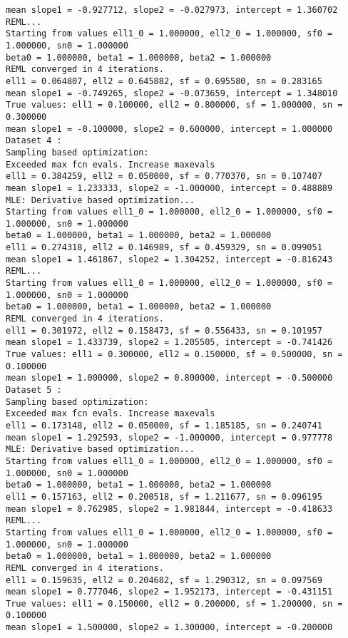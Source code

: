 \begin{verbatim}
mean slope1 = -0.927712, slope2 = -0.027973, intercept = 1.360702 
REML...
Starting from values ell1_0 = 1.000000, ell2_0 = 1.000000, sf0 = 1.000000, sn0 = 1.000000 
beta0 = 1.000000, beta1 = 1.000000, beta2 = 1.000000 
REML converged in 4 iterations. 
ell1 = 0.064807, ell2 = 0.645882, sf = 0.695580, sn = 0.283165 
mean slope1 = -0.749265, slope2 = -0.073659, intercept = 1.348010 
True values: ell1 = 0.100000, ell2 = 0.800000, sf = 1.000000, sn = 0.300000 
mean slope1 = -0.100000, slope2 = 0.600000, intercept = 1.000000 
Dataset 4 : 
Sampling based optimization:
Exceeded max fcn evals. Increase maxevals
ell1 = 0.384259, ell2 = 0.050000, sf = 0.770370, sn = 0.107407 
mean slope1 = 1.233333, slope2 = -1.000000, intercept = 0.488889 
MLE: Derivative based optimization...
Starting from values ell1_0 = 1.000000, ell2_0 = 1.000000, sf0 = 1.000000, sn0 = 1.000000 
beta0 = 1.000000, beta1 = 1.000000, beta2 = 1.000000 
ell1 = 0.274318, ell2 = 0.146989, sf = 0.459329, sn = 0.099051 
mean slope1 = 1.461867, slope2 = 1.304252, intercept = -0.816243 
REML...
Starting from values ell1_0 = 1.000000, ell2_0 = 1.000000, sf0 = 1.000000, sn0 = 1.000000 
beta0 = 1.000000, beta1 = 1.000000, beta2 = 1.000000 
REML converged in 4 iterations. 
ell1 = 0.301972, ell2 = 0.158473, sf = 0.556433, sn = 0.101957 
mean slope1 = 1.433739, slope2 = 1.205505, intercept = -0.741426 
True values: ell1 = 0.300000, ell2 = 0.150000, sf = 0.500000, sn = 0.100000 
mean slope1 = 1.000000, slope2 = 0.800000, intercept = -0.500000 
Dataset 5 : 
Sampling based optimization:
Exceeded max fcn evals. Increase maxevals
ell1 = 0.173148, ell2 = 0.050000, sf = 1.185185, sn = 0.240741 
mean slope1 = 1.292593, slope2 = -1.000000, intercept = 0.977778 
MLE: Derivative based optimization...
Starting from values ell1_0 = 1.000000, ell2_0 = 1.000000, sf0 = 1.000000, sn0 = 1.000000 
beta0 = 1.000000, beta1 = 1.000000, beta2 = 1.000000 
ell1 = 0.157163, ell2 = 0.200518, sf = 1.211677, sn = 0.096195 
mean slope1 = 0.762985, slope2 = 1.981844, intercept = -0.418633 
REML...
Starting from values ell1_0 = 1.000000, ell2_0 = 1.000000, sf0 = 1.000000, sn0 = 1.000000 
beta0 = 1.000000, beta1 = 1.000000, beta2 = 1.000000 
REML converged in 4 iterations. 
ell1 = 0.159635, ell2 = 0.204682, sf = 1.290312, sn = 0.097569 
mean slope1 = 0.777046, slope2 = 1.952173, intercept = -0.431151 
True values: ell1 = 0.150000, ell2 = 0.200000, sf = 1.200000, sn = 0.100000 
mean slope1 = 1.500000, slope2 = 1.300000, intercept = -0.200000 
\end{verbatim} \color{black}

